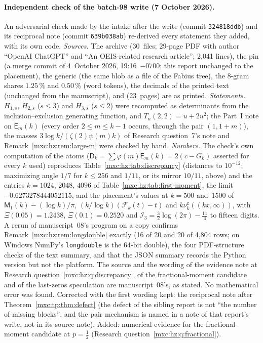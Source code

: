 \documentclass[11pt]{article}
\numberwithin{equation}{section}
\theoremstyle{definition}
\theoremstyle{remark}
\newcommand{\hznu}{\nu^{\mathrm z}}
\begin{document}
\paragraph{Independent check of the batch-98 write (7 October 2026).} An
adversarial check made by the intake after the write (commit
\texttt{324818ddb}) and its reciprocal note (commit \texttt{639b038ab})
re-derived every statement they added, with its own code. \emph{Sources.}
The archive (30~files; 29-page PDF with author ``OpenAI ChatGPT'' and
``An OEIS-related research article''; 2{,}041 lines), the pin (a merge
commit of 4~October 2026, 19:16~$-0700$; this report unchanged to the
placement), the generic  (the same blob as a file of
the Fabius tree), the 8-gram shares $1.25\,\%$ and $0.50\,\%$ (word
tokens), the decimals of the printed text (unchanged from the
manuscript), \cite{hzpsi} and \cite{hztoth} (23~pages) are as printed.
\emph{Statements.} $H_{1,s}$, $H_{2,s}$ ($s\le3$) and $H_{3,s}$ ($s\le2$)
were recomputed as determinants from the inclusion--exclusion generating
function, and $T_u(2,2)=u+2u^2$; the Part~I note on $\mathsf E_m(k)$ (every
order $2\le m\le k-1$ occurs, through the pair $(1,1+m)$), the masses
$3\log k/(\zeta(2)\psi(m)k)$ of Research question~7's note and
Remark~\ref{mxc:hz:rem:large-m} were checked by hand. \emph{Numbers.} The
check's own computation of the atoms ($\mathsf D_k=\sum\varphi(m)\mathsf
E_m(k)=2(c-G_k)$ asserted for every $k$ used) reproduces
Table~\ref{mxc:hz:tab:discrepancy} (distances to $10^{-12}$; maximizing
angle $1/7$ for $k\le256$ and $1/11$, or its mirror $10/11$, above) and the
entries $k=1024$, $2048$, $4096$ of
Table~\ref{mxc:hz:tab:first-moment}, the limit $-0.6273278444052115$, and
the placement's values at $k=500$ and~$1500$ of $\mathsf M_1(k)-(\log
k)/\pi$, $(k/\log k)(\mathcal F_k(t)-t)$ and $k\hznu_k((kx,\infty))$, with
$\Xi(0.05)=1.2438$, $\Xi(0.1)=0.2520$ and $\mathcal I_3=\frac32\log(2\pi)-\frac{11}4$
to fifteen digits. A rerun of manuscript~08's program on a copy confirms
Remark~\ref{mxc:hz:rem:longdouble} exactly (16 of 20 and 20 of 4{,}804 rows;
on Windows NumPy's \texttt{longdouble} is the 64-bit double), the four
PDF-structure checks of the text summary, and that the JSON summary
records the Python version but not the platform. The source and the
wording of the evidence note at Research question~\ref{mxc:hz:q:discrepancy},
of the fractional-moment candidate and of the last-zeros speculation are
manuscript~08's, as stated. No mathematical error was found. Corrected
with the first wording kept: the reciprocal note after
Theorem~\ref{mxc:tp:thm:defect} (the defect of the sibling report is not
``the number of missing blocks'', and the pair mechanism is named in a
note of that report's write, not in its source note). Added: numerical
evidence for the fractional-moment candidate at $p=\frac12$ (Research
question~\ref{mxc:hz:q:fractional}).
\end{document}
